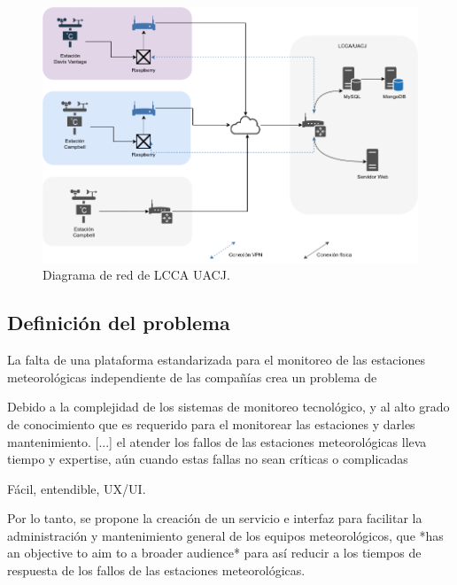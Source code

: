 \begin{figure}[!ht]
	\centering
	\includegraphics[width=.80\linewidth]{images/diagrams/current_network.png}
	\caption{Diagrama de red de LCCA UACJ.}
	\label{fig:current_network}
\end{figure}

\subsection{Definición del problema}

La falta de una plataforma estandarizada para el monitoreo de las estaciones meteorológicas independiente de las compañías crea un problema de
\cite{muller_sensors_and_the_city}



Debido a la complejidad de los sistemas de monitoreo tecnológico, y al alto grado de conocimiento que es requerido para el monitorear las estaciones y darles mantenimiento. [...] el atender los fallos de las estaciones meteorológicas lleva tiempo y expertise, aún cuando estas fallas no sean críticas o complicadas



Fácil, entendible, UX/UI.

Por lo tanto, se propone la creación de un servicio e interfaz para facilitar la administración y mantenimiento general de los equipos meteorológicos, que *has an objective to aim to a broader audience* para así reducir a los tiempos de respuesta de los fallos de las estaciones meteorológicas.


